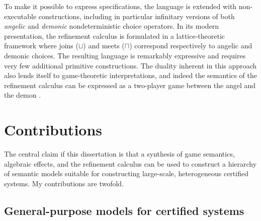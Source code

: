 \documentclass[draft,11pt]{report}
\theoremstyle{definition}
\begin{document}
To make it possible to express specifications,
the language is extended with non-executable constructions,
including in particular infinitary versions of both
\emph{angelic} and \emph{demonic} nondeterministic choice operators.
In its modern presentation,
the refinement calculus is formulated in a lattice-theoretic framework
where joins ($\sqcup$) and meets ($\sqcap$)
correspond respectively to angelic and demonic choices.
The resulting language is remarkably expressive
and requires very few additional primitive constructions.
The duality inherent in this approach
also lends itself to game-theoretic interpretations,
and indeed the semantics of the refinement calculus
can be expressed as a two-player game between
the angel and the demon \citep[\S 14]{refcal}.

%



\section{Contributions} %
\label{ssec:contrib}

The central claim if this dissertation is that a synthesis
of %
game semantics, algebraic effects, and the refinement calculus
can be used to construct a hierarchy of semantic models
suitable for constructing large-scale, heterogeneous certified systems.
My contributions are twofold.

\subsection{General-purpose models for certified systems} %
\end{document}
